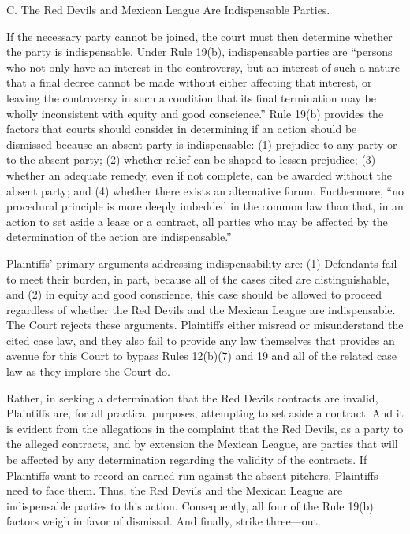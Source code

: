 \documentclass[11pt,letterpaper,twoside]{article}
\begin{document}
{C. The Red Devils and Mexican League Are Indispensable Parties.}

If the necessary party cannot be joined, the court must then determine
whether the party is indispensable. Under Rule 19(b), indispensable
parties are ``persons who not only have an interest in the controversy,
but an interest of such a nature that a final decree cannot be made
without either affecting that interest, or leaving the controversy in
such a condition that its final termination may be wholly inconsistent
with equity and good conscience.'' Rule 19(b) provides the factors that
courts should consider in determining if an action should be dismissed
because an absent party is indispensable: (1) prejudice to any party or
to the absent party; (2) whether relief can be shaped to lessen
prejudice; (3) whether an adequate remedy, even if not complete, can be
awarded without the absent party; and (4) whether there exists an
alternative forum. Furthermore, ``no procedural principle is more deeply
imbedded in the common law than that, in an action to set aside a lease
or a contract, all parties who may be affected by the determination of
the action are indispensable.''

Plaintiffs' primary arguments addressing indispensability are: (1)
Defendants fail to meet their burden, in part, because all of the cases
cited are distinguishable, and (2) in equity and good conscience, this
case should be allowed to proceed regardless of whether the Red Devils
and the Mexican League are indispensable. The Court rejects these
arguments. Plaintiffs either misread or misunderstand the cited case
law, and they also fail to provide any law themselves that provides an
avenue for this Court to bypass Rules 12(b)(7) and 19 and all of the
related case law as they implore the Court do.

Rather, in seeking a determination that the Red Devils contracts are
invalid, Plaintiffs are, for all practical purposes, attempting to set
aside a contract. And it is evident from the allegations in the
complaint that the Red Devils, as a party to the alleged contracts, and
by extension the Mexican League, are parties that will be affected by
any determination regarding the validity of the contracts. If Plaintiffs
want to record an earned run against the absent pitchers, Plaintiffs
need to face them. Thus, the Red Devils and the Mexican League are
indispensable parties to this action. Consequently, all four of the Rule
19(b) factors weigh in favor of dismissal. And finally, strike
three---out.
\end{document}
